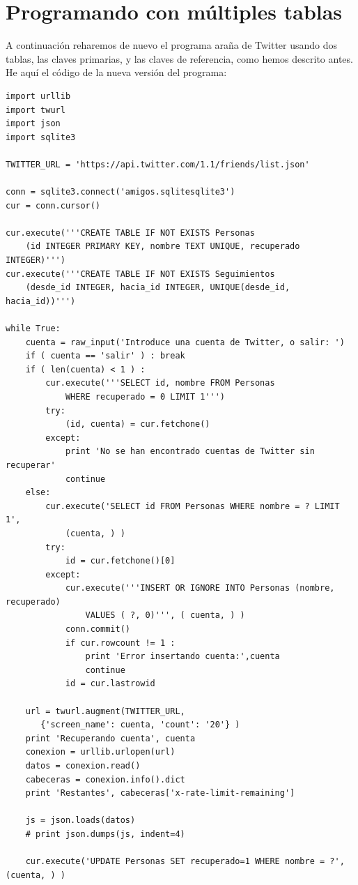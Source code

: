\section{Programando con múltiples tablas}

A continuación reharemos de nuevo el programa araña de Twitter usando dos tablas, las claves
primarias, y las claves de referencia, como hemos descrito antes. He aquí el código
de la nueva versión del programa:

\beforeverb
\begin{verbatim}
import urllib
import twurl
import json
import sqlite3

TWITTER_URL = 'https://api.twitter.com/1.1/friends/list.json'

conn = sqlite3.connect('amigos.sqlitesqlite3')
cur = conn.cursor()

cur.execute('''CREATE TABLE IF NOT EXISTS Personas 
    (id INTEGER PRIMARY KEY, nombre TEXT UNIQUE, recuperado INTEGER)''')
cur.execute('''CREATE TABLE IF NOT EXISTS Seguimientos 
    (desde_id INTEGER, hacia_id INTEGER, UNIQUE(desde_id, hacia_id))''')

while True:
    cuenta = raw_input('Introduce una cuenta de Twitter, o salir: ')
    if ( cuenta == 'salir' ) : break
    if ( len(cuenta) < 1 ) :
        cur.execute('''SELECT id, nombre FROM Personas
            WHERE recuperado = 0 LIMIT 1''')
        try:
            (id, cuenta) = cur.fetchone()
        except:
            print 'No se han encontrado cuentas de Twitter sin recuperar'
            continue
    else:
        cur.execute('SELECT id FROM Personas WHERE nombre = ? LIMIT 1', 
            (cuenta, ) )
        try:
            id = cur.fetchone()[0]
        except:
            cur.execute('''INSERT OR IGNORE INTO Personas (nombre, recuperado) 
                VALUES ( ?, 0)''', ( cuenta, ) )
            conn.commit()
            if cur.rowcount != 1 : 
                print 'Error insertando cuenta:',cuenta
                continue
            id = cur.lastrowid

    url = twurl.augment(TWITTER_URL, 
       {'screen_name': cuenta, 'count': '20'} )
    print 'Recuperando cuenta', cuenta
    conexion = urllib.urlopen(url)
    datos = conexion.read()
    cabeceras = conexion.info().dict
    print 'Restantes', cabeceras['x-rate-limit-remaining']

    js = json.loads(datos)
    # print json.dumps(js, indent=4)

    cur.execute('UPDATE Personas SET recuperado=1 WHERE nombre = ?', (cuenta, ) )


\end{verbatim}

